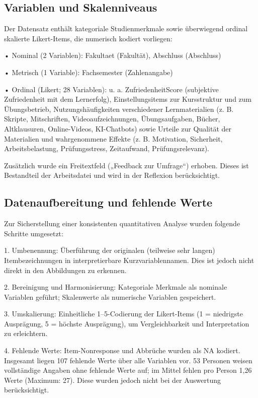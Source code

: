 \documentclass[a4paper,12pt]{article}
\begin{document}
\subsection{Variablen und Skalenniveaus}

Der Datensatz enthält kategoriale Studienmerkmale sowie überwiegend ordinal skalierte Likert-Items, die numerisch kodiert vorliegen:

    • Nominal (2 Variablen):
Fakultaet (Fakultät), Abschluss (Abschluss)

    • Metrisch (1 Variable):
Fachsemester (Zahlenangabe)

    • Ordinal (Likert; 28 Variablen):
u. a. ZufriedenheitScore (subjektive Zufriedenheit mit dem Lernerfolg), Einstellungsitems zur Kursstruktur und zum Übungsbetrieb, Nutzungshäufigkeiten verschiedener Lernmaterialien (z. B. Skripte, Mitschriften, Videoaufzeichnungen, Übungsaufgaben, Bücher, Altklausuren, Online-Videos, KI-Chatbots) sowie Urteile zur Qualität der Materialien und wahrgenommene Effekte (z. B. Motivation, Sicherheit, Arbeitsbelastung, Prüfungsstress, Zeitaufwand, Prüfungsrelevanz).

Zusätzlich wurde ein Freitextfeld („Feedback zur Umfrage“) erhoben. Dieses ist Bestandteil der Arbeitsdatei und wird in der Reflexion berücksichtigt. 

\subsection{Datenaufbereitung und fehlende Werte}

Zur Sicherstellung einer konsistenten quantitativen Analyse wurden folgende Schritte umgesetzt:

    1. Umbenennung: Überführung der originalen (teilweise sehr langen) Itembezeichnungen in interpretierbare Kurzvariablennamen. Dies ist jedoch nicht direkt in den Abbildungen zu erkennen.  
    
    2. Bereinigung und Harmonisierung: Kategoriale Merkmale als nominale Variablen geführt; Skalenwerte als numerische Variablen gespeichert.
    
    3. Umskalierung: Einheitliche 1–5-Codierung der Likert-Items (1 = niedrigste Ausprägung, 5 = höchste Ausprägung), um Vergleichbarkeit und Interpretation zu erleichtern.
    
    4. Fehlende Werte: Item-Nonresponse und Abbrüche wurden als NA kodiert. Insgesamt liegen 107 fehlende Werte über alle Variablen vor. 53 Personen weisen vollständige Angaben ohne fehlende Werte auf; im Mittel fehlen pro Person 1,26 Werte (Maximum: 27). Diese wurden jedoch nicht bei der Auswertung berücksichtigt.
    
\end{document}

